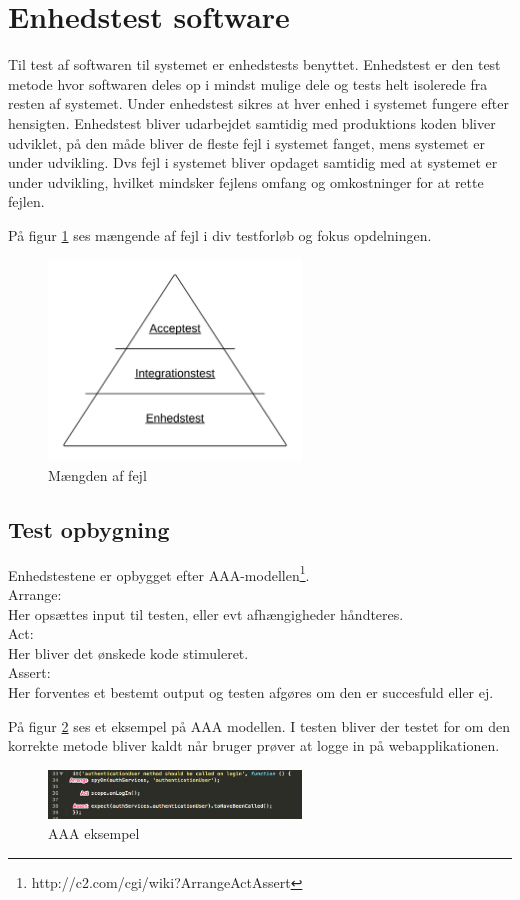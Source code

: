 \section{Enhedstest software}
Til test af softwaren til systemet er enhedstests benyttet. Enhedstest er den test metode hvor softwaren deles op i mindst mulige dele og tests helt isolerede fra resten af systemet. Under enhedstest sikres at hver enhed i systemet fungere efter hensigten. Enhedstest bliver udarbejdet samtidig med produktions koden  bliver udviklet, på den måde bliver de fleste fejl i systemet fanget, mens systemet er under udvikling. Dvs fejl i systemet bliver opdaget samtidig med at systemet er under udvikling, hvilket mindsker fejlens omfang og omkostninger for at rette fejlen.

På figur \ref{fig:test_forlob} ses mængende af fejl i div testforløb og fokus opdelningen.
\begin{figure}[H]
	\centering
	\includegraphics[width=0.6\textwidth]{Billeder/Test/forlob.png}
	\caption{Mængden af fejl}
	\label{fig:test_forlob}
\end{figure}

\subsection{Test opbygning}
Enhedstestene er opbygget efter AAA-modellen\footnote{http://c2.com/cgi/wiki?ArrangeActAssert}.\\ 
Arrange: \\
Her opsættes input til testen, eller evt afhængigheder håndteres. \\
Act: \\
Her bliver det ønskede kode stimuleret. \\
Assert: \\
Her forventes et bestemt output og testen afgøres om den er succesfuld eller ej.

\newpage
På  figur \ref{fig:aaa} ses et eksempel på AAA modellen. I testen bliver der testet for om den korrekte metode bliver kaldt når bruger prøver at logge in på webapplikationen. 

\begin{figure}[H]
	\centering
	\includegraphics[width=0.6\textwidth]{Billeder/Test/aaa.png}
	\caption{AAA eksempel}
	\label{fig:aaa}
\end{figure}
